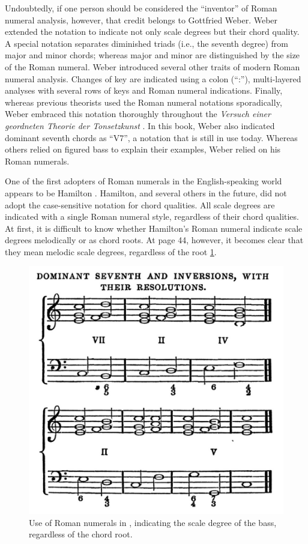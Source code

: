 Undoubtedly, if one person should be considered the ``inventor'' of Roman numeral analysis, however, that credit belongs to Gottfried Weber.
Weber extended the notation to indicate not only scale degrees but their chord quality.
A special notation separates diminished triads (i.e., the seventh degree) from major and minor chords; whereas major and minor are distinguished by the size of the Roman numeral.
Weber introduced several other traits of modern Roman numeral analysis.
Changes of key are indicated using a colon (``:''), multi-layered analyses with several rows of keys and Roman numeral indications.
Finally, whereas previous theorists used the Roman numeral notations sporadically, Weber embraced this notation thoroughly throughout the \emph{Versuch einer geordneten Theorie der Tonsetzkunst} \cite{weber1817versuch}.
In this book, Weber also indicated dominant seventh chords as ``V7'', a notation that is still in use today.
Whereas others relied on figured bass to explain their examples, Weber relied on his Roman numerals.

One of the first adopters of Roman numerals in the English-speaking world appears to be Hamilton \cite{hamilton1840cathecism}.
Hamilton, and several others in the future, did not adopt the case-sensitive notation for chord qualities.
All scale degrees are indicated with a single Roman numeral style, regardless of their chord qualities.
At first, it is difficult to know whether Hamilton's Roman numeral indicate scale degrees melodically or as chord roots.
At page 44, however, it becomes clear that they mean melodic scale degrees, regardless of the root \ref{fig:hamilton1840cathecism044}.

\begin{figure}
    \centering
    \includegraphics[width=\textwidth]{figures/chapter/2/primary_sources/hamilton1840cathecism044.png}
    \caption{Use of Roman numerals in \cite{hamilton1840cathecism}, indicating the scale degree of the bass, regardless of the chord root.}
    \label{fig:hamilton1840cathecism044}
\end{figure}

